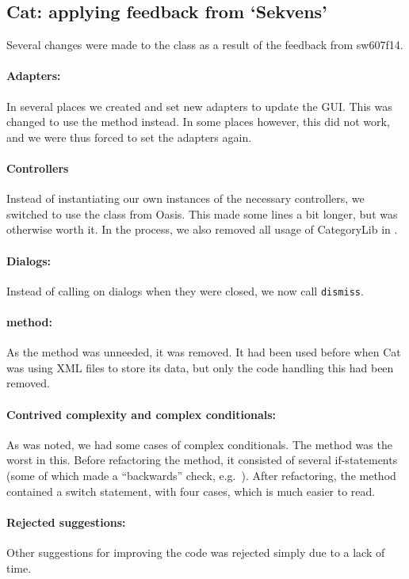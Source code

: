 \subsection{Cat: applying feedback from `Sekvens'}\label{subsec:collab_catresult}
Several changes were made to the class  as a result of the feedback from sw607f14.

\paragraph{Adapters:}
In several places we created and set new adapters to update the GUI. This was changed to use the  method instead. In some places however, this did not work, and we were thus forced to set the adapters again.

\paragraph{Controllers}
Instead of instantiating our own instances of the necessary controllers, we switched to use the  class from Oasis. This made some lines a bit longer, but was otherwise worth it. In the process, we also removed all usage of CategoryLib in .

\paragraph{Dialogs:}
Instead of calling  on dialogs when they were closed, we now call \texttt{dismiss}.

\paragraph{ method:}
As the  method was unneeded, it was removed. It had been used before when Cat was using XML files to store its data, but only the code handling this had been removed.

\paragraph{Contrived complexity and complex conditionals:}
As was noted, we had some cases of complex conditionals. The  method was the worst in this. Before refactoring the method, it consisted of several if-statements (some of which made a ``backwards'' check, e.g.\ ). After refactoring, the method contained a switch statement, with four cases, which is much easier to read.

\paragraph{Rejected suggestions:}
Other suggestions for improving the code was rejected simply due to a lack of time.